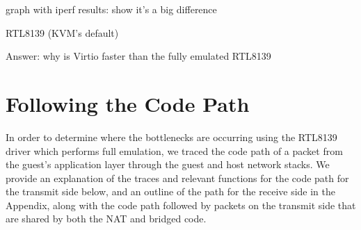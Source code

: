 \documentclass[11pt,pdftex,twocolumn]{article}
\begin{document}
graph with iperf results: show it's a big difference

RTL8139 (KVM's default)

Answer: why is Virtio faster than the fully emulated RTL8139

\section{Following the Code Path}
In order to determine where the bottlenecks are occurring using the RTL8139 driver which performs full emulation, we traced the code path of a packet from the guest's application layer through the guest and host network stacks. We provide an explanation of the traces and relevant functions for the code path for the transmit side below, and an outline of the path for the receive side in the Appendix, along with the code path followed by packets on the transmit side that are shared by both the NAT and bridged code. 
\end{document}
